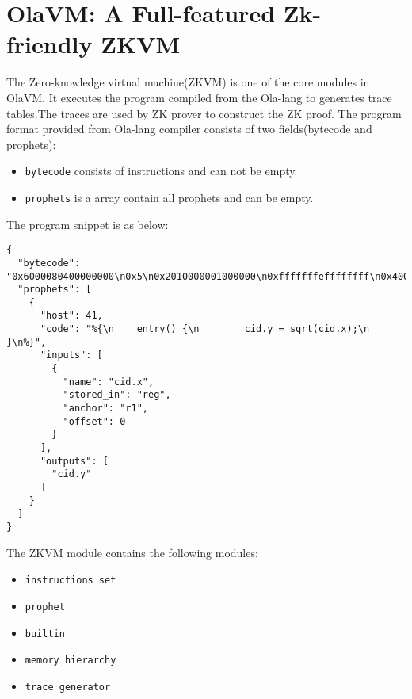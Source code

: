 \section{OlaVM: A Full-featured Zk-friendly ZKVM}\label{sec:ola-vm-a-full-featured-zk-friendly-zkvm}
The Zero-knowledge virtual machine(ZKVM) is one of the core modules in OlaVM. It executes the program compiled from the Ola-lang to generates trace tables.The traces are used by ZK prover to construct the ZK proof.
The program format provided from Ola-lang compiler consists of two fields(bytecode and prophets):
\begin{itemize}
    \item \verb|bytecode| consists of instructions and can not be empty.
    \item \verb|prophets| is a array contain all prophets and can be empty.
\end{itemize}

The program snippet is as below:
\begin{lstlisting}[label={lst:program-demo}]
{
  "bytecode": "0x6000080400000000\n0x5\n0x2010000001000000\n0xfffffffeffffffff\n0x4000000840000000\n0x0\n0x0030000001000000\n",
  "prophets": [
    {
      "host": 41,
      "code": "%{\n    entry() {\n        cid.y = sqrt(cid.x);\n    }\n%}",
      "inputs": [
        {
          "name": "cid.x",
          "stored_in": "reg",
          "anchor": "r1",
          "offset": 0
        }
      ],
      "outputs": [
        "cid.y"
      ]
    }
  ]
}
\end{lstlisting}


The ZKVM module contains the following modules:
\begin{itemize}
    \item \verb|instructions set|
    \item \verb|prophet|
    \item \verb|builtin|
    \item \verb|memory hierarchy|
    \item \verb|trace generator|
\end{itemize}





